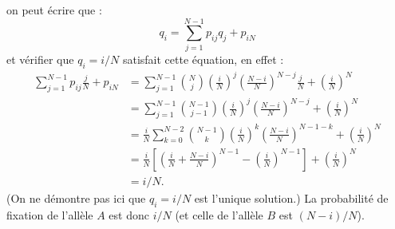 {\begin{description}
\begin{itemize}
    \end{itemize}
    on peut écrire que :
    $$
    q_i = \sum_{j=1}^{N-1} p_{ij} q_j + p_{iN}
    $$
    et vérifier que $q_i = i/N$ satisfait cette équation, en effet :
    \begin{align*}
      \sum_{j=1}^{N-1} p_{ij} \frac{j}N + p_{iN}
      & = \sum_{j=1}^{N-1} \binom{N}{j} \left(\frac{i}N\right)^j \left(\frac{N-i} N\right)^{N-j} \frac{j}N + \left(\frac{i}N\right)^N \\
      & = \sum_{j=1}^{N-1} \binom{N-1}{j-1} \left(\frac{i}N\right)^j \left(\frac{N-i} N\right)^{N-j} + \left(\frac{i}N\right)^N \\
      & = \frac{i}N \sum_{k=0}^{N-2} \binom{N-1}{k} \left(\frac{i}N\right)^k \left(\frac{N-i} N\right)^{N-1-k} + \left(\frac{i}N\right)^N \\
      & = \frac{i}N \left[\left(\frac{i}N + \frac{N-i}N\right)^{N-1} - \left(\frac{i}N\right)^{N-1}\right] + \left(\frac{i}N\right)^N \\
      & = i/N.
    \end{align*}
    (On ne démontre pas ici que $q_i = i/N$ est l'unique solution.) La probabilité de fixation de l'allèle $A$ est donc $i/N$ (et celle de l'allèle $B$ est $(N-i)/N$).
  \end{description}
  
}

